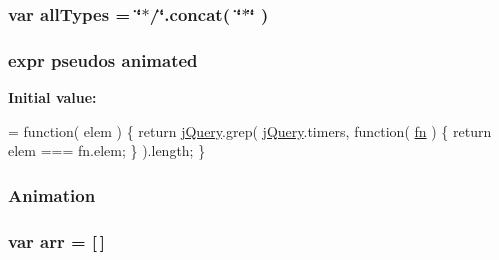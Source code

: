 \subsubsection[{\texorpdfstring{all\+Types}{allTypes}}]{\setlength{\rightskip}{0pt plus 5cm}var all\+Types = \char`\"{}$\ast$/\char`\"{}.{\bf concat}( \char`\"{}$\ast$\char`\"{} )}\hypertarget{jquery-3_82_81_8js_a2d6199559f6d1e840af674910a329b04}{}\label{jquery-3_82_81_8js_a2d6199559f6d1e840af674910a329b04}
\subsubsection[{\texorpdfstring{animated}{animated}}]{ {\bf expr} pseudos animated}\hypertarget{jquery-3_82_81_8js_a83a8dd5251ce80ae24966df4a26c71f1}{}\label{jquery-3_82_81_8js_a83a8dd5251ce80ae24966df4a26c71f1}
{\bfseries Initial value\+:}
\begin{DoxyCode}
= \textcolor{keyword}{function}( elem ) \{
    \textcolor{keywordflow}{return} \hyperlink{jquery-3_82_81_8js_a609525712f1102566c2b03866ceb2bba}{jQuery}.grep( \hyperlink{jquery-3_82_81_8js_a609525712f1102566c2b03866ceb2bba}{jQuery}.timers, \textcolor{keyword}{function}( \hyperlink{jquery-3_82_81_8js_acef6bdaf6b9b20fdcca1ea86f0902c3b}{fn} ) \{
        return elem === fn.elem;
    \} ).length;
\}
\end{DoxyCode}
\subsubsection[{\texorpdfstring{Animation}{Animation}}]{ Animation}\hypertarget{jquery-3_82_81_8js_a3299b781c8ec8287357326920ab3565a}{}\label{jquery-3_82_81_8js_a3299b781c8ec8287357326920ab3565a}
\subsubsection[{\texorpdfstring{arr}{arr}}]{\setlength{\rightskip}{0pt plus 5cm}var arr = \mbox{[}$\,$\mbox{]}}\hypertarget{jquery-3_82_81_8js_a9219f6f481200e42d75e135845aeeb3b}{}\label{jquery-3_82_81_8js_a9219f6f481200e42d75e135845aeeb3b}
